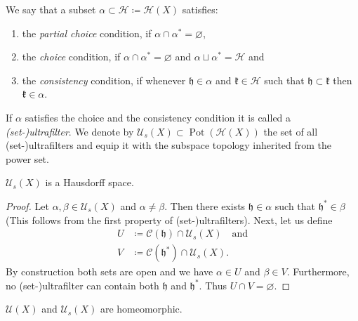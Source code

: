 \begin{defin}
  We say that a subset \(\alpha \subset \mathcal{H} \coloneqq \mathcal{H}(X)\) satisfies:
  \begin{enumerate}
  \item the \emph{partial choice} condition, if \(\alpha \cap \alpha^\ast = \varnothing\),
  \item the \emph{choice} condition, if \(\alpha \cap \alpha^\ast = \varnothing\) and \(\alpha \sqcup \alpha^\ast = \mathcal{H}\) and
  \item the \emph{consistency} condition, if whenever \(\mathfrak{h} \in \alpha\) and \(\mathfrak{k} \in \mathcal{H}\) such that \(\mathfrak{h} \subset \mathfrak{k}\) then \(\mathfrak{k} \in \alpha\).
  \end{enumerate}
  If \(\alpha\) satisfies the choice and the consistency condition it is called a \emph{(set-)ultrafilter}. We denote by \(\mathcal{U}_s(X) \subset \operatorname{Pot}(\mathcal{H}(X))\) the set of all (set-)ultrafilters and equip it with the subspace topology inherited from the power set.
\end{defin}

\begin{lemma}
  \(\mathcal{U}_s(X)\) is a Hausdorff space.
\end{lemma}

\begin{proof}
  Let \(\alpha, \beta \in \mathcal{U}_s(X)\) and \(\alpha \neq \beta\). Then there exists \(\mathfrak{h} \in \alpha\) such that \(\mathfrak{h}^\ast \in \beta\) (This follows from the first property of (set-)ultrafilters). Next, let us define
  \begin{align*}
    U & \coloneqq \mathcal{C}(\mathfrak{h}) \cap \mathcal{U}_s(X)\quad \text{and}\\
    V & \coloneqq \mathcal{C}(\mathfrak{h}^\ast) \cap \mathcal{U}_s(X).
  \end{align*}
  By construction both sets are open and we have \(\alpha \in U\) and \(\beta \in V\). Furthermore, no (set-)ultrafilter can contain both \(\mathfrak{h}\) and \(\mathfrak{h}^\ast\). Thus \(U \cap V = \varnothing\). 
\end{proof}

\begin{thm}
  \(\mathcal{U}(X)\) and \(\mathcal{U}_s(X)\) are homeomorphic.
\end{thm}

